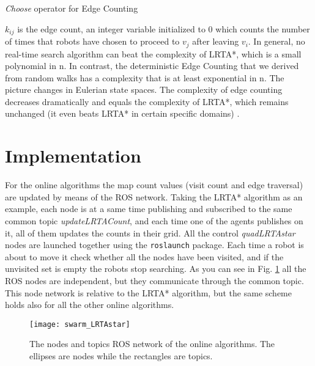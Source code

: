 \begin{algorithm}
\begin{algorithmic}[1]
 \label{a:find_next_ec}
\label{eq:ec_rule}
\end{algorithmic}
\caption{\emph{Choose} operator for Edge Counting}\label{alg:rt_ec}
\end{algorithm}

$k_{ij}$ is the edge count, an integer variable initialized to $0$ which counts the number of times that robots have chosen to proceed to $v_j$ after leaving $v_i$. In general, no real-time search algorithm can beat the complexity of LRTA*, which is a small polynomial in n. In contrast, the deterministic Edge Counting that we derived from random walks has a complexity that is at least exponential in n. The picture changes in Eulerian state spaces. The complexity of edge counting decreases dramatically and equals the complexity of LRTA*, which remains unchanged (it even beats LRTA* in certain specific domains) \cite{Koenig96easyand}. 




\pagebreak

\section{Implementation}

For the online algorithms the map count values (visit count and edge traversal) are updated by means of the ROS network. Taking the LRTA* algorithm as an example, each node is at a same time publishing and subscribed to the same common topic  \textit{updateLRTACount}, and each time one of the agents publishes on it, all of them updates the counts in their grid.
All the control \emph{quadLRTAstar} nodes are launched together using the \texttt{roslaunch} package. Each time a robot is about to move it check whether all the nodes have been visited, and if the unvisited set is empty the robots stop searching.
As you can see in Fig. \ref{fig:rt_nodes} all the ROS nodes are independent, but they communicate through the common topic. This node network is relative to the LRTA* algorithm, but the same scheme holds also for all the other online algorithms.

\begin{figure}[h]
\centering
\texttt{[image: swarm\_LRTAstar]}
\caption[ROS network for the online algorithms]{The nodes and topics ROS network of the online algorithms. The ellipses are nodes while the rectangles are topics.}
\label{fig:rt_nodes}
\end{figure}




